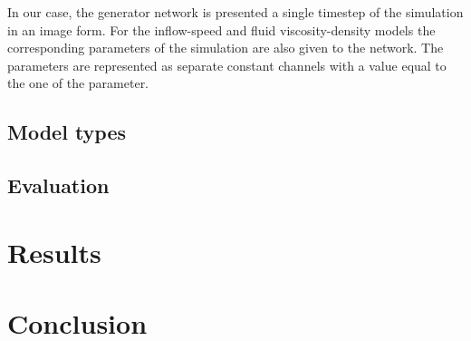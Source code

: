 \documentclass{llncs}
\begin{document}
In our case, the generator network is presented a single timestep of the simulation in an image form. For the inflow-speed and fluid viscosity-density models the corresponding parameters of the simulation are also given to the network. The parameters are represented as separate constant channels with a value equal to the one of the parameter. 


\subsection{Model types}

\subsection{Evaluation}

\section{Results}\label{results}



\section{Conclusion}\label{conclusion}



\clearpage


\end{document}
